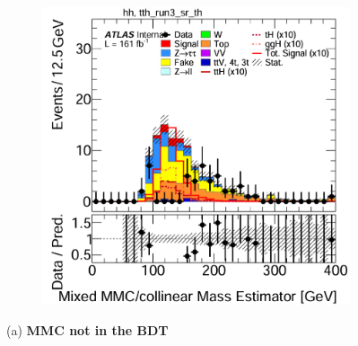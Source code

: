 \begin{figure}[htbp]
\begin{subfigure}[t]{0.45\textwidth}
    \includegraphics[width=\linewidth]{images/mmc_th_tth/run_3_wo_mmc_th.png}
  \end{subfigure}

  \vspace{0.2cm}
  \begin{minipage}{\textwidth}
    \centering
    \small {(a) \textbf{MMC not in the BDT}}
  \end{minipage}

  \vspace{0.5cm}


\end{figure}
